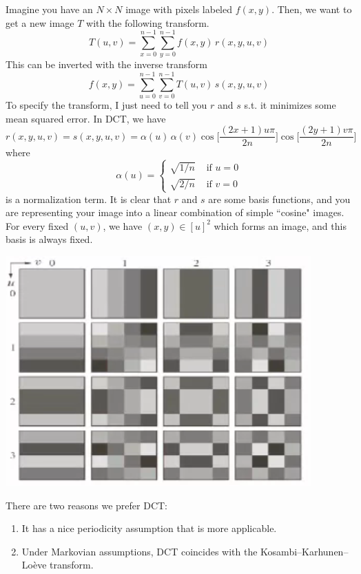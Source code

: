 \documentclass{article}
\begin{document}
    Imagine you have an $N \times N$ image with pixels labeled $f(x, y)$. Then, we want to get a new image $T$ with the following transform. 
    \[T(u, v) = \sum_{x=0}^{n-1} \sum_{y=0}^{n-1} f(x, y) \, r(x, y, u, v)\]
    This can be inverted with the inverse transform 
    \[f(x, y) = \sum_{u=0}^{n-1} \sum_{v=0}^{n-1} T(u, v) \, s(x, y, u, v)\]
    To specify the transform, I just need to tell you $r$ and $s$ s.t. it minimizes some mean squared error. In DCT, we have 
    \[r(x, y, u, v) = s(x, y, u, v) = \alpha(u) \, \alpha(v) \cos \bigg[ \frac{(2x + 1) u \pi}{2 n} \bigg] \cos \bigg[ \frac{(2 y + 1) v \pi}{2 n} \bigg]\]
    where 
    \[\alpha (u) = \begin{cases} \sqrt{1/n} & \text{ if } u = 0 \\ \sqrt{2/n} & \text{ if } v = 0 \end{cases}\]
    is a normalization term. It is clear that $r$ and $s$ are some basis functions, and you are representing your image into a linear combination of simple ``cosine" images. For every fixed $(u, v)$, we have $(x, y) \in [u]^2$ which forms an image, and this basis is always fixed. 
    \begin{center}
        \includegraphics[scale=0.4]{img/cosine_transform.png}
    \end{center}

    There are two reasons we prefer DCT: 
    \begin{enumerate}
        \item It has a nice periodicity assumption that is more applicable. 
        \item Under Markovian assumptions, DCT coincides with the Kosambi–Karhunen–Loève transform. 
    \end{enumerate}
\end{document}
